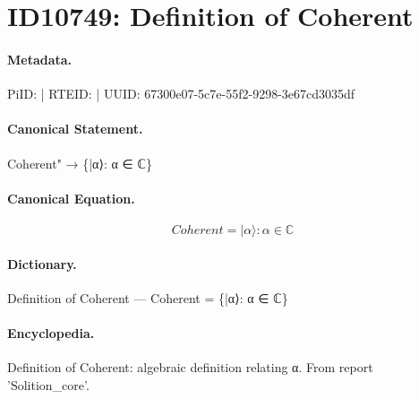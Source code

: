 \section*{ID10749: Definition of Coherent}
\paragraph{Metadata.}
PiID:  | RTEID:  | UUID: 67300e07-5c7e-55f2-9298-3e67cd3035df

\paragraph{Canonical Statement.}
Coherent" → \{|α⟩: α ∈ ℂ\}

\paragraph{Canonical Equation.}
\[
Coherent = {|α⟩: α ∈ ℂ}
\]

\paragraph{Dictionary.}
Definition of Coherent — Coherent = \{|α⟩: α ∈ ℂ\}

\paragraph{Encyclopedia.}
Definition of Coherent: algebraic definition relating α. From report 'Solition\_core'.
